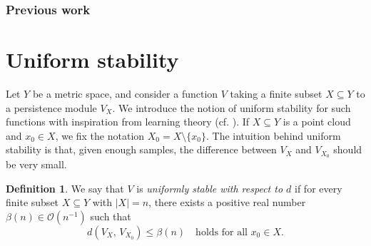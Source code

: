 \documentclass[10pt,a4paper]{article}
\theoremstyle{definition}
\newtheorem{defn}[thm]{Definition}
\begin{document}
\subsubsection{Previous work}


\section{Uniform stability}
Let $Y$ be a metric space, and consider a function $V$ taking a finite subset $X\subseteq Y$ to a persistence module $V_X$. We introduce the notion of uniform stability for such functions with inspiration from learning theory (cf. \cite{bousquet2002stability}). If $X\subseteq Y$ is a point cloud and $x_0\in X$, we fix the notation $X_0 = X\setminus\{x_0\}$. The intuition behind uniform stability is that, given enough samples, the difference between $V_X$ and $V_{X_0}$ should be very small.

\begin{defn}\label{def_uniform_stability}
	We say that $V$ is \textit{uniformly stable with respect to $d$} if for every finite subset $X\subseteq Y$ with $|X|=n$, there exists a positive real number $\beta(n)\in\mathcal{O}(n^{-1})$ such that
	\begin{equation}\label{eq_uniform_stability}
		 d\left(V_X,\,V_{X_0}\right) \leqslant \beta(n)\quad\text{holds for all }x_0\in X.
	\end{equation}
\end{defn}

\end{document}

